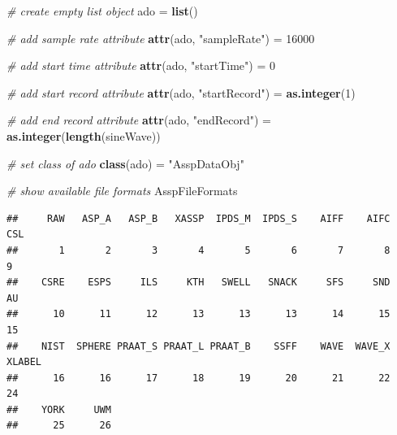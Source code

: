 \documentclass[]{book}
\newenvironment{Shaded}{\begin{snugshade}}{\end{snugshade}}
\newcommand{\CommentTok}[1]{\textcolor[rgb]{0.56,0.35,0.01}{\textit{#1}}}
\newcommand{\DecValTok}[1]{\textcolor[rgb]{0.00,0.00,0.81}{#1}}
\newcommand{\KeywordTok}[1]{\textcolor[rgb]{0.13,0.29,0.53}{\textbf{#1}}}
\newcommand{\NormalTok}[1]{#1}
\newcommand{\StringTok}[1]{\textcolor[rgb]{0.31,0.60,0.02}{#1}}
\theoremstyle{definition}
\theoremstyle{definition}
\theoremstyle{definition}
\theoremstyle{remark}
\begin{document}
\begin{Shaded}
\begin{Highlighting}[]
\CommentTok{# create empty list object}
\NormalTok{ado =}\StringTok{ }\KeywordTok{list}\NormalTok{()}

\CommentTok{# add sample rate attribute}
\KeywordTok{attr}\NormalTok{(ado, }\StringTok{"sampleRate"}\NormalTok{) =}\StringTok{ }\DecValTok{16000}

\CommentTok{# add start time attribute}
\KeywordTok{attr}\NormalTok{(ado, }\StringTok{"startTime"}\NormalTok{) =}\StringTok{ }\DecValTok{0}

\CommentTok{# add start record attribute}
\KeywordTok{attr}\NormalTok{(ado, }\StringTok{"startRecord"}\NormalTok{) =}\StringTok{ }\KeywordTok{as.integer}\NormalTok{(}\DecValTok{1}\NormalTok{)}

\CommentTok{# add end record attribute}
\KeywordTok{attr}\NormalTok{(ado, }\StringTok{"endRecord"}\NormalTok{) =}\StringTok{ }\KeywordTok{as.integer}\NormalTok{(}\KeywordTok{length}\NormalTok{(sineWave))}

\CommentTok{# set class of ado}
\KeywordTok{class}\NormalTok{(ado) =}\StringTok{ "AsspDataObj"}

\CommentTok{# show available file formats}
\NormalTok{AsspFileFormats}
\end{Highlighting}
\end{Shaded}

\begin{verbatim}
##     RAW   ASP_A   ASP_B   XASSP  IPDS_M  IPDS_S    AIFF    AIFC     CSL 
##       1       2       3       4       5       6       7       8       9 
##    CSRE    ESPS     ILS     KTH   SWELL   SNACK     SFS     SND      AU 
##      10      11      12      13      13      13      14      15      15 
##    NIST  SPHERE PRAAT_S PRAAT_L PRAAT_B    SSFF    WAVE  WAVE_X  XLABEL 
##      16      16      17      18      19      20      21      22      24 
##    YORK     UWM 
##      25      26
\end{verbatim}
\end{document}
